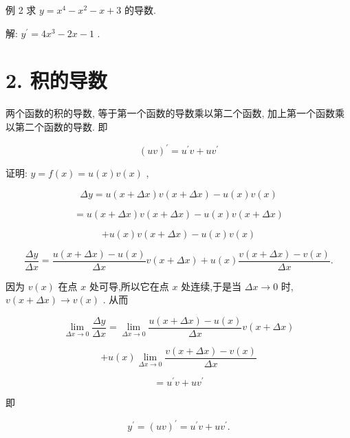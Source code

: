 \documentclass[lang=cn,newtx,12pt,scheme=chinese]{elegantbook}
\begin{document}
例 2 求 \(y = {x}^{4} - {x}^{2} - x + 3\) 的导数.

解: \({y}^{\prime } = 4{x}^{3} - {2x} - 1\) .

\section*{2. 积的导数}

\begin{proposition}[法则2(乘法法则)]

两个函数的积的导数, 等于第一个函数的导数乘以第二个函数, 加上第一个函数乘以第二个函数的导数. 即

\[
{\left( uv\right) }^{\prime } = {u}^{\prime }v + u{v}^{\prime }
\]

\end{proposition}

证明: \(y = f\left( x\right) = u\left( x\right) v\left( x\right)\) ,

\[
{\Delta y} = u\left( {x + {\Delta x}}\right) v\left( {x + {\Delta x}}\right) - u\left( x\right) v\left( x\right)
\]

\[
= u\left( {x + {\Delta x}}\right) v\left( {x + {\Delta x}}\right) - u\left( x\right) v\left( {x + {\Delta x}}\right)
\]

\[
+ u\left( x\right) v\left( {x + {\Delta x}}\right) - u\left( x\right) v\left( x\right)
\]

\[
\frac{\Delta y}{\Delta x} = \frac{u\left( {x + {\Delta x}}\right) - u\left( x\right) }{\Delta x}v\left( {x + {\Delta x}}\right) + u\left( x\right) \frac{v\left( {x + {\Delta x}}\right) - v\left( x\right) }{\Delta x}.
\]

因为 \(v\left( x\right)\) 在点 \(x\) 处可导,所以它在点 \(x\) 处连续,于是当 \({\Delta x} \rightarrow 0\) 时, \(v\left( {x + {\Delta x}}\right) \rightarrow v\left( x\right)\) . 从而

\[
\mathop{\lim }\limits_{{{\Delta x} \rightarrow 0}}\frac{\Delta y}{\Delta x} = \mathop{\lim }\limits_{{{\Delta x} \rightarrow 0}}\frac{u\left( {x + {\Delta x}}\right) - u\left( x\right) }{\Delta x}v\left( {x + {\Delta x}}\right)
\]

\[
+ u\left( x\right) \mathop{\lim }\limits_{{{\Delta x} \rightarrow 0}}\frac{v\left( {x + {\Delta x}}\right) - v\left( x\right) }{\Delta x}
\]

\[
= {u}^{\prime }v + u{v}^{\prime }
\]

即

\[
{y}^{\prime } = {\left( uv\right) }^{\prime } = {u}^{\prime }v + u{v}^{\prime }.
\]
\end{document}
